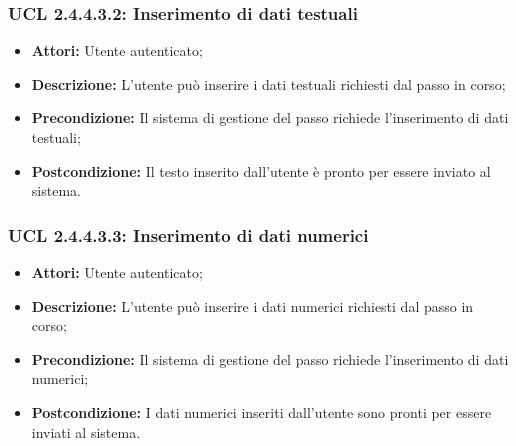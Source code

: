 \subsubsection{UCL 2.4.4.3.2: Inserimento di dati testuali}
\begin{itemize}
\item \textbf{Attori:} Utente autenticato;
\item \textbf{Descrizione:} L'utente può inserire i dati testuali richiesti dal passo in corso;
\item \textbf{Precondizione:} Il sistema di gestione del passo richiede l'inserimento di dati testuali;
\item \textbf{Postcondizione:} Il testo inserito dall'utente è pronto per essere inviato al sistema.
\end{itemize}

\hypertarget{L2.4.4.3.3}{}
\subsubsection{UCL 2.4.4.3.3: Inserimento di dati numerici}
\begin{itemize}
\item \textbf{Attori:} Utente autenticato;
\item \textbf{Descrizione:} L'utente può inserire i dati numerici richiesti dal passo in corso;
\item \textbf{Precondizione:} Il sistema di gestione del passo richiede l'inserimento di dati numerici;
\item \textbf{Postcondizione:} I dati numerici inseriti dall'utente sono pronti per essere inviati al sistema.
\end{itemize}

\hypertarget{L2.4.4.4}{}
